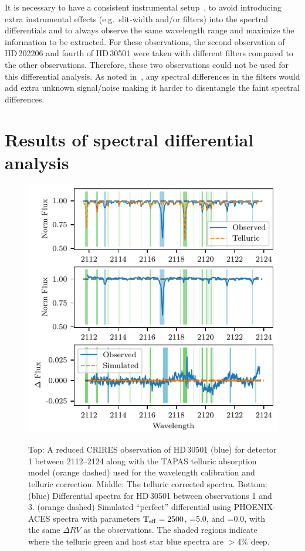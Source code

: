 It is necessary to have a consistent instrumental setup~\citep{ferluga_separating_1997}, to avoid introducing extra instrumental effects (e.g.\ slit-width and/or filters) into the spectral differentials and to always observe the same wavelength range and maximize the information to be extracted.
For these observations, the second observation of {HD\,202206} and fourth of {HD\,30501} were taken with different filters compared to the other observations.
Therefore, these two observations could not be used for this differential analysis.
As noted in~\citet{hadrava_disentangling_2009}, any spectral differences in the filters would add extra unknown signal/noise making it harder to disentangle the faint spectral differences.


\section{Results of spectral differential analysis}
\label{subsec:differential_results}

\begin{figure}
    \centering
    \includegraphics[width=0.8\hsize]{figures/direct-recovery/differential.pdf}\\
    \caption[Example of the spectral differential technique.]{Top: A reduced {CRIRES} observation of {HD\,30501} (blue) for detector 1 between 2112--2124\nm{} along with the {TAPAS} telluric absorption model ({orange} dashed) used for the wavelength calibration and telluric correction.
    Middle: The telluric corrected spectra.
    Bottom: ({blue}) Differential spectra for {HD\,30501} between observations 1 and 3.
    ({orange} dashed) Simulated ``perfect'' differential using {PHOENIX-ACES} spectra with parameters \(\textrm{T}_{\mathrm{eff}}{}=2500\)\K{}, \logg{}=5.0, and \feh{}=0.0, with the same \(\Delta {RV}\) as the observations.
    The shaded regions indicate where the telluric {green} and host star {blue} spectra are \(> 4\%\) deep.}
    \label{fig:spectral_example}
\end{figure}


